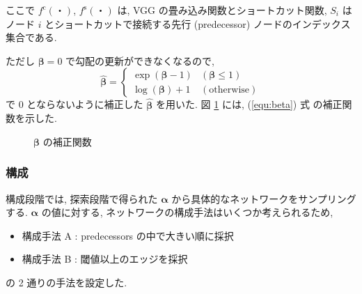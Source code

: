 ここで $f^{\mathrm{c}}(・)$, $f^{\mathrm{s}}(・)$ は, VGG の畳み込み関数とショートカット関数,
$S_i$ はノード $i$ とショートカットで接続する先行 (predecessor) ノードのインデックス集合である.

ただし $\bm{\beta}=0$ で勾配の更新ができなくなるので,
\begin{equation}
  \label{equ:beta}
  \hat{\bm{\beta}} = \begin{cases}
    \exp(\bm{\beta} - 1) & (\bm{\beta} \leq 1) \\
    \log(\bm{\beta}) + 1 & (\mathrm{otherwise})
  \end{cases}
\end{equation}
で 0 とならないように補正した $\hat{\bm{\beta}}$ を用いた.
図 \ref{fig:pred/beta} には, (\ref{equ:beta}) 式 の補正関数を示した.

\begin{figure}[t]
  \begin{center}
  \end{center}
  \caption{$\bm{\beta}$ の補正関数}
  \label{fig:pred/beta}
\end{figure}




\subsubsection{構成}

構成段階では, 探索段階で得られた $\bm{\alpha}$ から具体的なネットワークをサンプリングする.
$\bm{\alpha}$ の値に対する, ネットワークの構成手法はいくつか考えられるため,
\begin{itemize}
  \item 構成手法 A : predecessors の中で大きい順に採択
  \item 構成手法 B : 閾値以上のエッジを採択
\end{itemize}
の 2 通りの手法を設定した.

